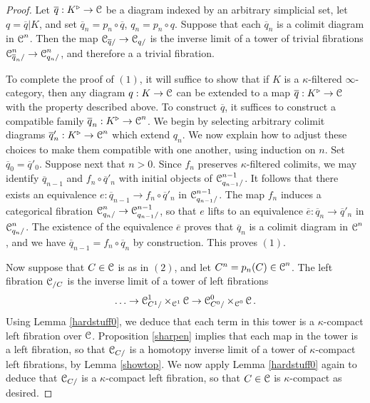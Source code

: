 \begin{proof}
Let $\overline{q}: K^{\triangleright} \rightarrow \operatorname{\mathcal{C}}$ be a diagram indexed by an arbitrary simplicial set, let $q = \overline{q}|K$, and set $\overline{q}_n = p_n \circ \overline{q}$, 
$q_n = p_n \circ q$. Suppose that each $\overline{q}_n$ is a colimit diagram in $\operatorname{\mathcal{C}}^n$.
Then the map $\operatorname{\mathcal{C}}_{\overline{q}/} \rightarrow \operatorname{\mathcal{C}}_{q/}$ is the inverse limit of a tower of trivial fibrations $\operatorname{\mathcal{C}}^n_{\overline{q}_n/} \rightarrow \operatorname{\mathcal{C}}^n_{q_n/}$, and therefore a a trivial fibration.

To complete the proof of $(1)$, it will suffice to show that if $K$ is a $\kappa$-filtered $\infty$-category, then any diagram $q: K \rightarrow \operatorname{\mathcal{C}}$ can be extended to a map
$\overline{q}: K^{\triangleright} \rightarrow \operatorname{\mathcal{C}}$ with the property described above.
To construct $\overline{q}$, it suffices to construct a compatible family $\overline{q}_n:
K^{\triangleright} \rightarrow \operatorname{\mathcal{C}}^n$. We begin by selecting arbitrary colimit diagrams
$\overline{q}'_n: K^{\triangleright} \rightarrow \operatorname{\mathcal{C}}^n$ which extend $q_n$. 
We now explain how to adjust these choices to make them compatible with one another, using induction on $n$. Set $\overline{q}_0 = \overline{q}'_0$. Suppose next that $n > 0$.
Since $f_n$ preserves $\kappa$-filtered colimits, we may identify
$\overline{q}_{n-1}$ and $f_n \circ \overline{q}'_{n}$ with initial objects of
$\operatorname{\mathcal{C}}^{n-1}_{q_{n-1}/}$. It follows that there exists an equivalence
$e: \overline{q}_{n-1} \rightarrow f_n \circ \overline{q}'_{n}$ in $\operatorname{\mathcal{C}}^{n-1}_{q_{n-1}/}$. The map
$f_n$ induces a categorical fibration $\operatorname{\mathcal{C}}^n_{q_n/} \rightarrow \operatorname{\mathcal{C}}^{n-1}_{q_{n-1}/}$, so that
$e$ lifts to an equivalence $\overline{e}: \overline{q}_n \rightarrow \overline{q}'_n$ in
$\operatorname{\mathcal{C}}^n_{q_n/}$. The existence of the equivalence $\overline{e}$ proves that
$\overline{q}_n$ is a colimit diagram in $\operatorname{\mathcal{C}}^n$, and we have
$\overline{q}_{n-1} = f_n \circ \overline{q}_n$ by construction. This proves $(1)$.

Now suppose that $C \in \operatorname{\mathcal{C}}$ is as in $(2)$, and let $C^n = p_n(C) \in \operatorname{\mathcal{C}}^n$. 
The left fibration $\operatorname{\mathcal{C}}_{/C}$ is the inverse limit of a tower of left fibrations
$$ \ldots \rightarrow \operatorname{\mathcal{C}}^1_{C^1/} \times_{\operatorname{\mathcal{C}}^1} \operatorname{\mathcal{C}} \rightarrow \operatorname{\mathcal{C}}^0_{C^0/} \times_{\operatorname{\mathcal{C}}^0} \operatorname{\mathcal{C}}.$$
Using Lemma \ref{hardstuff0}, we deduce that each term in this tower is a $\kappa$-compact left fibration over $\operatorname{\mathcal{C}}$. Proposition \ref{sharpen} implies that each map in the tower is a left fibration, so that $\operatorname{\mathcal{C}}_{C/}$ is a homotopy inverse limit of a tower of $\kappa$-compact left fibrations, by Lemma \ref{showtop}. We now apply Lemma \ref{hardstuff0} again to deduce that
$\operatorname{\mathcal{C}}_{C/}$ is a $\kappa$-compact left fibration, so that $C \in \operatorname{\mathcal{C}}$ is $\kappa$-compact as desired.
\end{proof}

